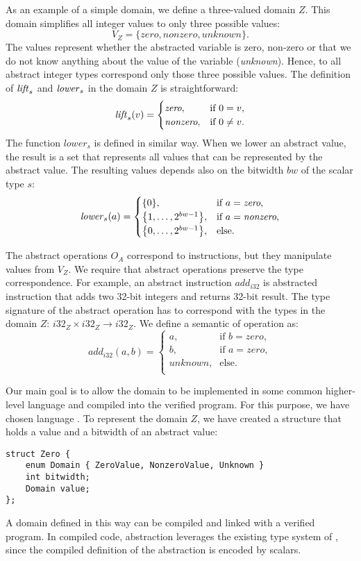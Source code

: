 As an example of a simple domain, we define a three-valued domain $Z$.
This domain simplifies all integer values to only three possible values:
\[ V_Z = \{ \textit{zero}, \textit{nonzero}, \textit{unknown} \}.\]
The values represent whether the abstracted variable is zero, non-zero or that
we do not know anything about the value of the variable (\emph{unknown}).
Hence, to all abstract integer types correspond only those three possible
values. The definition of $\mathit{lift}_s$ and $\mathit{lower}_s$ in the domain $Z$ is straightforward:
\[
  \mathit{lift}_s(v) =
  \begin{cases}
    \textit{zero},    & \text{if } 0 = v, \\
    \textit{nonzero}, & \text{if } 0 \not = v.\\
  \end{cases}
\]
The function $lower_s$ is defined in similar way. When we lower an
abstract value, the result is a set that represents all values that can be
represented by the abstract value. The resulting values depends also on the
bitwidth $bw$ of the scalar type $s$:
\[
  \mathit{lower}_s(a) =
  \begin{cases}
        \{0\},                            & \text{if } a = \textit{zero},\\
        \big\{1, \dots ,2^{bw - 1}\big\}, & \text{if } a = \textit{nonzero},\\
        \big\{0, \dots ,2^{bw - 1}\big\}, & \text{else}. \\
  \end{cases}
\]

The abstract operations $O_A$ correspond to \LLVM instructions, but they
manipulate values from $V_Z$. We require that abstract operations preserve the
type correspondence. For example, an abstract instruction $\mathit{add}_{i32}$ is
abstracted \LLVM instruction that adds two 32-bit integers and returns 32-bit
result. The type signature of the abstract operation has to correspond with the
types in the domain $Z$: ${i32}_Z \times {i32}_Z \to {i32}_Z$. 
We define a semantic of operation as:
\[
  \mathit{add}_{i32}(a, b) =
  \begin{cases}
    a,      & \text{if } b = \textit{zero},\\
    b,      & \text{if } a = \textit{zero},\\
    \textit{unknown},   & \text{else}. \\
  \end{cases}
\]

Our main goal is to allow the domain to be implemented in some common higher-level
language and compiled into the verified program. For this purpose,
we have chosen language \Cpp{}. To represent the domain $Z$, we have created a
structure that holds a value and a bitwidth of an abstract value:
\begin{verbatim}
struct Zero {
    enum Domain { ZeroValue, NonzeroValue, Unknown }
    int bitwidth;
    Domain value;
};
\end{verbatim}
A domain defined in this way can be compiled and linked with a verified
program. In compiled code, abstraction leverages the existing type system of
\LLVM, since the compiled definition of the abstraction is encoded by \LLVM scalars.

